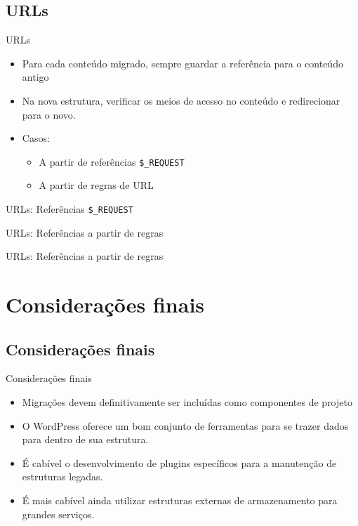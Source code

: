 \documentclass{beamer}
\begin{document}
\subsection{URLs}

\begin{frame}{URLs}
  \begin{itemize}
    \item Para cada conteúdo migrado, sempre guardar a referência
          para o conteúdo antigo
    \pause \item Na nova estrutura, verificar os meios de acesso no conteúdo
           e redirecionar para o novo.
    \pause \item Casos:
    \begin{itemize}
      \item A partir de referências \texttt{\$\_REQUEST}
      \item A partir de regras de URL
    \end{itemize}
  \end{itemize}
\end{frame}

\begin{frame}{URLs: Referências \texttt{\$\_REQUEST}}
  
\end{frame}

\begin{frame}{URLs: Referências a partir de regras}
  
\end{frame}

\begin{frame}{URLs: Referências a partir de regras}
  
\end{frame}

\section{Considerações finais}
\subsection{Considerações finais}

\begin{frame}{Considerações finais}
  \begin{itemize}
    \pause \item Migrações devem definitivamente ser incluídas como componentes
      de projeto
    \pause \item O WordPress oferece um bom conjunto de ferramentas para se
      trazer dados para dentro de sua estrutura.
    \pause \item É cabível o desenvolvimento de plugins específicos para a
      manutenção de estruturas legadas.
    \item É mais cabível ainda utilizar estruturas externas de armazenamento
      para grandes serviços.
  \end{itemize}
\end{frame}
\end{document}
